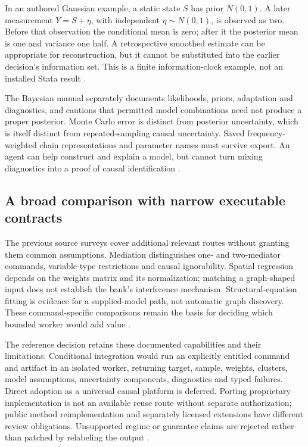 In an authored Gaussian example, a static state $S$ has prior $N(0,1)$.
A later measurement $Y=S+\eta$, with independent $\eta\sim N(0,1)$, is
observed as two. Before that observation the conditional mean is zero;
after it the posterior mean is one and variance one half. A retrospective
smoothed estimate can be appropriate for reconstruction, but it cannot
be substituted into the earlier decision's information set. This is a
finite information-clock example, not an installed Stata result
\cite{exec24_stata_choice}.

The Bayesian manual separately documents likelihoods, priors, adaptation
and diagnostics, and cautions that permitted model combinations need not
produce a proper posterior. Monte Carlo error is distinct from posterior
uncertainty, which is itself distinct from repeated-sampling causal
uncertainty. Saved frequency-weighted chain representations and parameter
names must survive export. An agent can help construct and explain a model,
but cannot turn mixing diagnostics into a proof of causal identification
\cite{exec22_state_stata_bayesmh,exec24_stata_choice}.

\subsection{A broad comparison with narrow executable contracts}
The previous source surveys cover additional relevant routes without
granting them common assumptions. Mediation distinguishes one- and
two-mediator commands, variable-type restrictions and causal ignorability.
Spatial regression depends on the weights matrix and its normalization;
matching a graph-shaped input does not establish the bank's interference
mechanism. Structural-equation fitting is evidence for a supplied-model
path, not automatic graph discovery. These command-specific comparisons
remain the basis for deciding which bounded worker would add value
\cite{exec13_ci_stata_mediate,exec20_med_stata_multiple,
exec20_network_stata_spregress,exec13_stata_sem,exec24_stata_choice}.

The reference decision retains these documented capabilities and their
limitations. Conditional integration would run an explicitly entitled
command and artifact in an isolated worker, returning target, sample,
weights, clusters, model assumptions, uncertainty components, diagnostics
and typed failures. Direct adoption as a universal causal platform is
deferred. Porting proprietary implementation is not an available reuse route
without separate authorization; public method reimplementation and
separately licensed extensions have different review obligations.
Unsupported regime or guarantee claims are rejected rather than patched
by relabeling the output \cite{exec13_ivrd_license,exec24_stata_choice}.

